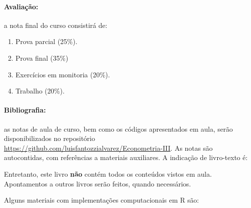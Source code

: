 \documentclass[10pt,a4paper]{article}
\begin{document}
	\paragraph{Avaliação:} a nota final do curso consistirá de:
	
	\begin{enumerate}
		\item Prova parcial (25\%).
		\item Prova final (35\%)
		\item Exercícios em monitoria (20\%).
		\item Trabalho (20\%).
	\end{enumerate}
	
	\paragraph{Bibliografia:} as notas de aula de curso, bem como os códigos apresentados em aula, serão disponibilizados no repositório \url{https://github.com/luisfantozzialvarez/Econometria-III}. As notas são autocontidas, com referências a materiais auxiliares. A indicação de livro-texto é:
	
	\vspace{1em}
	{\color{blue}\noindent{}}
		\vspace{1em}
		
	Entretanto, este livro \textbf{não} contém todos os conteúdos vistos em aula. Apontamentos a outros livros serão feitos, quando necessários.
	
	Alguns materiais com implementações computacionais em R são:
		\vspace{1em}
	{\color{red}
		\noindent{}
		
		\vspace{1em}
	\noindent{}
	
			\vspace{1em}
	\noindent{}
	
	\vspace{1em}
	\noindent{}}
\end{document}
